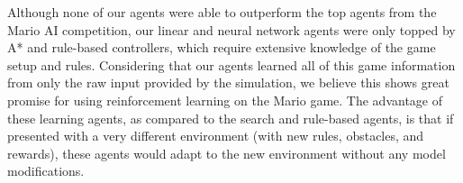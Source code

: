 \documentclass[12pt]{article}
\begin{document}
Although none of our agents were able to outperform the top agents from the Mario AI competition, our linear and neural network agents were only topped by A* and rule-based controllers, which require extensive knowledge of the game setup and rules. Considering that our agents learned all of this game information from only the raw input provided by the simulation, we believe this shows great promise for using reinforcement learning on the Mario game. The advantage of these learning agents, as compared to the search and rule-based agents, is that if presented with a very different environment (with new rules, obstacles, and rewards), these agents would adapt to the new environment without any model modifications.


\printbibliography
\end{document}
